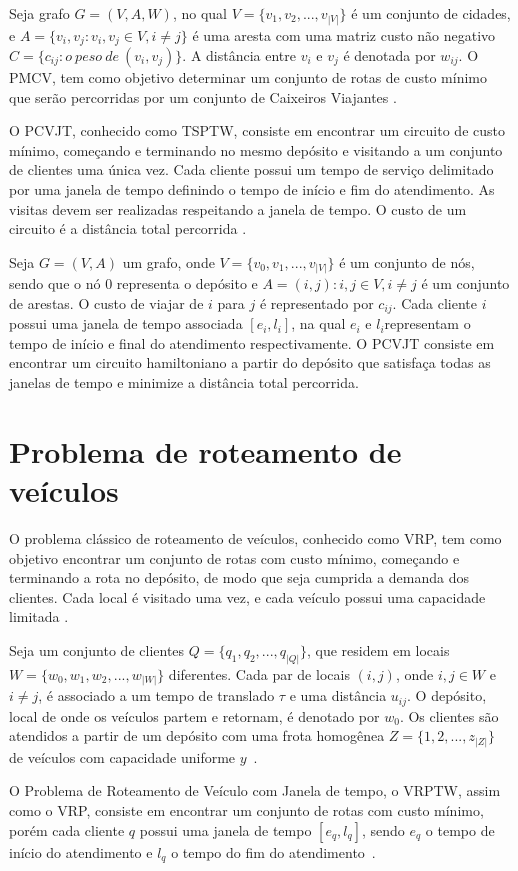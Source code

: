 Seja grafo $G = (V,A,W)$, no qual $V = \{v_1, v_2, ..., v_{|V|}\}$ é um conjunto de cidades, e $A = \{ v_i,v_j: v_i,v_j \in V, i \neq j\}$ é uma aresta com uma matriz custo não negativo $C = \{c_{ij}: o \ peso \ de \ (v_i,v_j)\}$. A distância entre $v_i$ e $v_j$ é denotada por $w_{ij}$. O \ac{PMCV}, tem como objetivo determinar um conjunto de rotas de custo mínimo que serão percorridas por um conjunto de Caixeiros Viajantes \cite{meng:2012}. 

O \ac{PCVJT}, conhecido como \ac{TSPTW}, consiste em encontrar um circuito de custo mínimo, começando e terminando no mesmo depósito e visitando a um conjunto de clientes uma única vez. Cada cliente possui um tempo de serviço delimitado por uma janela de tempo definindo o tempo de início e fim do atendimento. As visitas devem ser realizadas respeitando a janela de tempo. O custo de um circuito é a distância total percorrida \cite{urrutia:2010}.

Seja $G=(V,A)$ um grafo, onde $V = \{v_0, v_1, ..., v_{|V|} \}$ é um conjunto de nós, sendo que o nó $0$ representa o depósito e $A = {(i,j): i,j \in V, i \neq j}$ é um conjunto de arestas. O custo de viajar de $i$ para $j$ é representado por $c_{ij}$. Cada cliente $i$ possui uma janela de tempo associada $[e_i, l_i]$, na qual $e_i$ e $l_i$representam o tempo de início e final do atendimento respectivamente. O \ac{PCVJT} consiste em encontrar um circuito hamiltoniano a partir do depósito que satisfaça todas as janelas de tempo e minimize a distância total percorrida\cite{urrutia:2010}.

\section{Problema de roteamento de veículos}

O problema clássico de roteamento de veículos, conhecido como \ac{VRP}, tem como objetivo encontrar um conjunto de rotas com custo mínimo, começando e terminando a rota no depósito, de modo que seja cumprida a demanda dos clientes. Cada local é visitado uma vez, e cada veículo possui uma capacidade limitada \cite{gold:2008}.

Seja um conjunto de clientes $Q = \{q_1, q_2, ..., q_{|Q|}\}$, que residem em locais $W = \{w_0, w_1, w_2, ..., w_{|W|}\}$ diferentes. Cada par de locais $(i,j)$, onde  $i,j \in W$ e $i \neq j$, é associado a um tempo de translado $\tau$ e uma distância $u_{ij}$. O depósito, local de onde os veículos partem e retornam, é denotado por $w_0$.
Os clientes são atendidos a partir de um depósito com uma frota  homogênea $Z = \{1, 2, ..., z_{|Z|}\}$ de veículos com capacidade uniforme $y$~\cite{gold:2008}.

O Problema de Roteamento de Veículo com Janela de tempo, o \ac{VRPTW}, assim como o \ac{VRP}, consiste em encontrar um conjunto de rotas com custo mínimo, porém cada cliente $q$ possui uma janela de tempo $[e_{q}, l_{q}]$, sendo $e_{q}$ o tempo de início do atendimento e $l_{q}$ o tempo do fim do atendimento~\cite{gold:2008}.